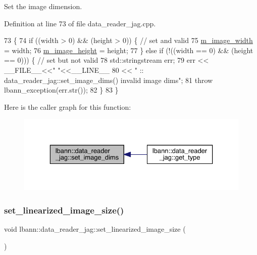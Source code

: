 Set the image dimension. 



Definition at line 73 of file data\+\_\+reader\+\_\+jag.\+cpp.


\begin{DoxyCode}
73                                                                       \{
74   \textcolor{keywordflow}{if} ((width > 0) && (height > 0)) \{ \textcolor{comment}{// set and valid}
75     \hyperlink{classlbann_1_1data__reader__jag_a193a91f2aab9f6373a7b376ff183cd0e}{m\_image\_width} = width;
76     \hyperlink{classlbann_1_1data__reader__jag_a6178d5dffd5e9bf7cf5703613cf9bd2e}{m\_image\_height} = height;
77   \} \textcolor{keywordflow}{else} \textcolor{keywordflow}{if} (!((width == 0) && (height == 0))) \{ \textcolor{comment}{// set but not valid}
78     std::stringstream err;
79     err << \_\_FILE\_\_<<\textcolor{stringliteral}{" "}<<\_\_LINE\_\_
80         << \textcolor{stringliteral}{" :: data\_reader\_jag::set\_image\_dims() invalid image dims"};
81     \textcolor{keywordflow}{throw} lbann\_exception(err.str());
82   \}
83 \}
\end{DoxyCode}
Here is the caller graph for this function\+:\nopagebreak
\begin{figure}[H]
\begin{center}
\leavevmode
\includegraphics[width=329pt]{classlbann_1_1data__reader__jag_a7b76ea4a64b8072728eb1b41d5a62f47_icgraph}
\end{center}
\end{figure}
\mbox{\label{classlbann_1_1data__reader__jag_af1e7add9e8bdcf97fe81bfc27b618387}} 
\subsubsection{\texorpdfstring{set\+\_\+linearized\+\_\+image\+\_\+size()}{set\_linearized\_image\_size()}}
{\footnotesize\ttfamily void lbann\+::data\+\_\+reader\+\_\+jag\+::set\+\_\+linearized\+\_\+image\+\_\+size (\begin{DoxyParamCaption}{ }\end{DoxyParamCaption})\hspace{0.3cm}{\ttfamily [protected]}}



